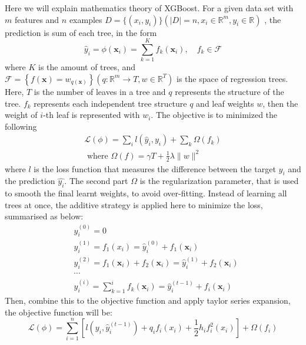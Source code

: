 \documentclass[12pt,a4paper,english
]{tunithesis}
\begin{document}
Here we will explain mathematics theory of XGBoost. For a given data set with $m$ features and $n$ examples $D = \{(x_i, y_i)\}(|D|=n, x_i \in \mathbb{R}^m, y_i \in \mathbb{R})$ , the prediction is sum of each tree, in the form
\begin{equation*}
    \hat{y}_i=\phi\left(\mathbf{x}_i\right)=\sum_{k=1}^K f_k\left(\mathbf{x}_i\right), \quad f_k \in \mathcal{F}
\end{equation*}
where $K$ is the amount of trees, and $\mathcal{F}=\left\{f(\mathbf{x})=w_{q(\mathbf{x})}\right\}\left(q: \mathbb{R}^m \rightarrow T, w \in \mathbb{R}^T\right)$ is the space of regression trees. Here, $T$ is the number of leaves in a tree and $q$ represents the structure of the tree. $f_k$ represents each independent tree structure $q$ and leaf weights $w$, then the weight of $i$-th leaf is represented with $w_i$. The objective is to minimized the following
\begin{equation*}
    \begin{gathered}
\mathcal{L}(\phi)=\sum_i l\left(\hat{y}_i, y_i\right)+\sum_k \Omega\left(f_k\right) \\
\text { where } \Omega(f)=\gamma T+\frac{1}{2} \lambda\|w\|^2
\end{gathered}
\end{equation*}
where $l$ is the loss function that measures the difference between the target $y_i$ and the prediction $\hat{y_i}$. The second part $\Omega$ is the regularization parameter, that is used to smooth the final learnt weights, to avoid over-fitting. Instead of learning all trees at once, the additive strategy is applied here to minimize the loss, summarised as below:
\begin{equation*}
    \begin{aligned}
& \hat{y}_i^{(0)}=0 \\
& \hat{y}_i^{(1)}=f_1\left(x_i\right)=\hat{y}_i^{(0)}+f_1\left(\mathbf{x}_i\right) \\
& \hat{y}_i^{(2)}=f_1\left(\mathbf{x}_i\right)+f_2\left(\mathbf{x}_i\right)=\hat{y}_i^{(1)}+f_2\left(\mathbf{x}_i\right) \\
& \cdots \\
& \hat{y}_i^{(i)}=\sum_{k=1}^i f_k\left(\mathbf{x}_i\right)=\hat{y}_i^{(t-1)}+f_i\left(\mathbf{x}_i\right)
\end{aligned}
\end{equation*}
Then, combine this to the objective function and apply taylor series expansion, the objective function will be:
\begin{equation*}
    \mathcal{L}(\phi)=\sum_{i=1}^n\left[l\left(y_i, \hat{y}_i^{(t-1)}\right)+q_i f_i\left(x_i\right)+\frac{1}{2} h_i f_i^2\left(x_i\right)\right]+\Omega\left(f_i\right)
\end{equation*}
\end{document}
